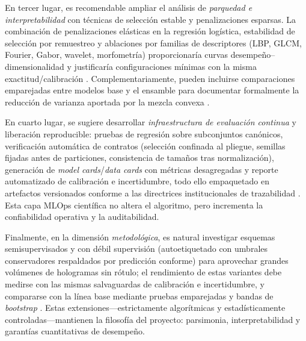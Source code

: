 En tercer lugar, es recomendable ampliar el análisis de \textit{parquedad e interpretabilidad} con técnicas de selección estable y penalizaciones esparsas. La combinación de penalizaciones elásticas en la regresión logística, estabilidad de selección por remuestreo y ablaciones por familias de descriptores (LBP, GLCM, Fourier, Gabor, wavelet, morfometría) proporcionaría curvas desempeño–dimensionalidad y justificaría configuraciones mínimas con la misma exactitud/calibración \cite{Pedregosa2011,Tsamardinos2022}. Complementariamente, pueden incluirse comparaciones emparejadas entre modelos base y el ensamble para documentar formalmente la reducción de varianza aportada por la mezcla convexa \cite{Friedman2001}.

En cuarto lugar, se sugiere desarrollar \textit{infraestructura de evaluación continua} y liberación reproducible: pruebas de regresión sobre subconjuntos canónicos, verificación automática de contratos (selección confinada al pliegue, semillas fijadas antes de particiones, consistencia de tamaños tras normalización), generación de \emph{model cards}/\emph{data cards} con métricas desagregadas y reporte automatizado de calibración e incertidumbre, todo ello empaquetado en artefactos versionados conforme a las directrices institucionales de trazabilidad \cite{EAFIT2018,Tsamardinos2022}. Esta capa MLOps científica no altera el algoritmo, pero incrementa la confiabilidad operativa y la auditabilidad.

Finalmente, en la dimensión \textit{metodológica}, es natural investigar esquemas semisupervisados y con débil supervisión (autoetiquetado con umbrales conservadores respaldados por predicción conforme) para aprovechar grandes volúmenes de hologramas sin rótulo; el rendimiento de estas variantes debe medirse con las mismas salvaguardas de calibración e incertidumbre, y compararse con la línea base mediante pruebas emparejadas y bandas de \emph{bootstrap} \cite{Montero2024,Tsamardinos2022,Vabalas2019}. Estas extensiones—estrictamente algorítmicas y estadísticamente controladas—mantienen la filosofía del proyecto: parsimonia, interpretabilidad y garantías cuantitativas de desempeño.
